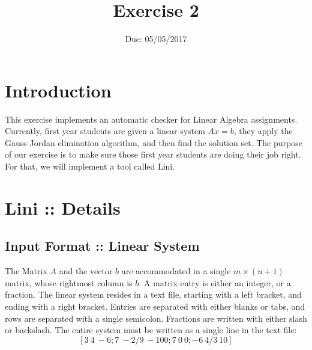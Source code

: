 \documentclass{article}
\begin{document}
\title{Exercise 2}
\date{Due: 05/05/2017}
\maketitle

\section{Introduction}
This exercise implements an automatic checker for Linear Algebra assignments.
Currently, first year students are given a linear system $Ax=b$,
they apply the Gauss Jordan elimination algorithm, and then find the solution set.
The purpose of our exercise is to make sure those first year students
are doing their job right. For that, we will implement a tool called Lini.

\section{Lini :: Details}
\subsection*{Input Format :: Linear System}
The Matrix $A$ and the vector $b$ are accommodated in a single
$m \times (n+1)$ matrix, whose rightmost column is $b$.
A matrix entry is either an integer, or a fraction.
The linear system resides in a text file,
starting with a left bracket, and ending with a right bracket.
Entries are separated with either blanks or tabs, and rows are separated with
a single semicolon. Fractions are written with either slash or backslash.
The entire system must be written as a single line in the text file:\\
\[
[ 3 ~ 4 ~ -6; 7 ~ -2/9 ~ -100; 7 ~ 0 ~ 0; -6 ~ 4/3 ~ 10]
\]
\end{document}
